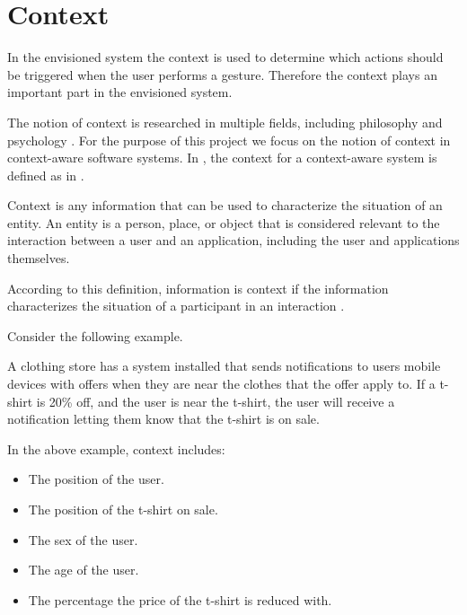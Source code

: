 \section{Context}
\label{sec:analysis:context}

In the envisioned system the context is used to determine which actions should be triggered when the user performs a gesture. Therefore the context plays an important part in the envisioned system.

The notion of context is researched in multiple fields, including philosophy and psychology \cite{bolchini2007data}. For the purpose of this project we focus on the notion of context in context-aware software systems. In \cite{abowd1999towards}, the context for a context-aware system is defined as in .

\begin{definition}
\label{def:context}
Context is any information that can be used to characterize the situation of an entity. An entity is a person, place, or object that is considered relevant to the interaction between a user and an application, including the user and applications themselves.
\end{definition}

According to this definition, information is context if the information characterizes the situation of a participant in an interaction \cite{abowd1999towards}.

Consider the following example.

\begin{testexample}
A clothing store has a system installed that sends notifications to users mobile devices with offers when they are near the clothes that the offer apply to. If a t-shirt is 20\% off, and the user is near the t-shirt, the user will receive a notification letting them know that the t-shirt is on sale.
\end{testexample}

In the above example, context includes:

\begin{itemize}
\item The position of the user.
\item The position of the t-shirt on sale.
\item The sex of the user.
\item The age of the user.
\item The percentage the price of the t-shirt is reduced with.
\end{itemize}

